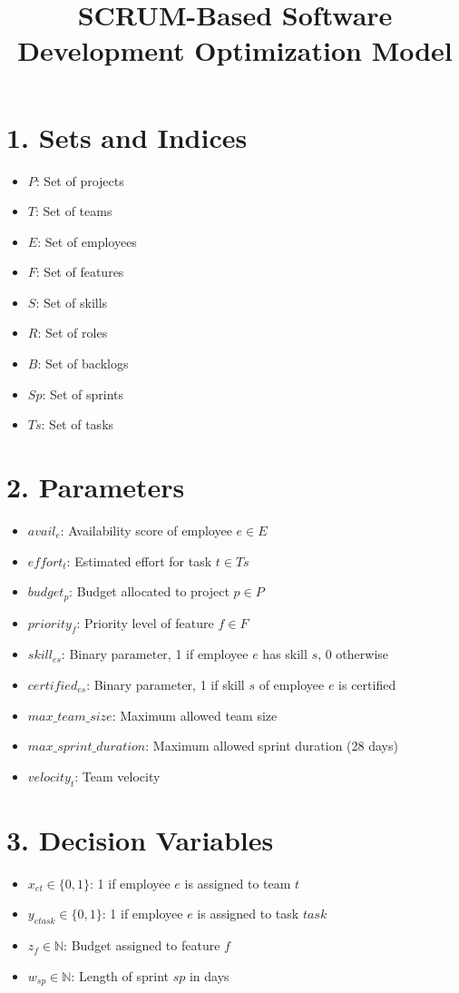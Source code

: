 \documentclass{article}
\title{SCRUM-Based Software Development Optimization Model}
\author{}
\date{}
\begin{document}
\maketitle

\section*{1. Sets and Indices}
\begin{itemize}
    \item $P$: Set of projects
    \item $T$: Set of teams
    \item $E$: Set of employees
    \item $F$: Set of features
    \item $S$: Set of skills
    \item $R$: Set of roles
    \item $B$: Set of backlogs
    \item $Sp$: Set of sprints
    \item $Ts$: Set of tasks
\end{itemize}

\section*{2. Parameters}
\begin{itemize}
    \item $avail_e$: Availability score of employee $e \in E$
    \item $effort_t$: Estimated effort for task $t \in Ts$
    \item $budget_p$: Budget allocated to project $p \in P$
    \item $priority_f$: Priority level of feature $f \in F$
    \item $skill_{es}$: Binary parameter, 1 if employee $e$ has skill $s$, 0 otherwise
    \item $certified_{es}$: Binary parameter, 1 if skill $s$ of employee $e$ is certified
    \item $max\_team\_size$: Maximum allowed team size
    \item $max\_sprint\_duration$: Maximum allowed sprint duration (28 days)
    \item $velocity_t$: Team velocity
\end{itemize}

\section*{3. Decision Variables}
\begin{itemize}
    \item $x_{et} \in \{0,1\}$: 1 if employee $e$ is assigned to team $t$
    \item $y_{etask} \in \{0,1\}$: 1 if employee $e$ is assigned to task $task$
    \item $z_{f} \in \mathbb{N}$: Budget assigned to feature $f$
    \item $w_{sp} \in \mathbb{N}$: Length of sprint $sp$ in days
\end{itemize}
\end{document}
